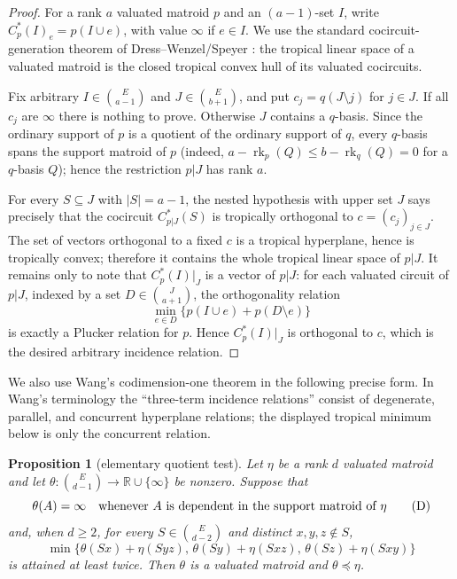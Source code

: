 \documentclass[12pt]{article}
\newcommand{\rk}{\operatorname{rk}}
\newtheorem{proposition}{Proposition}
\begin{document}
\begin{proof}
For a rank $a$ valuated matroid $p$ and an $(a-1)$-set $I$, write
$C^*_p(I)_e=p(I\cup e)$, with value $\infty$ if $e\in I$.  We use the
standard cocircuit-generation theorem of Dress--Wenzel/Speyer \cite{DW,Speyer}: the
tropical linear space of a valuated matroid is the closed tropical convex
hull of its valuated cocircuits.

Fix arbitrary $I\in\binom{E}{a-1}$ and $J\in\binom{E}{b+1}$, and put
$c_j=q(J\setminus j)$ for $j\in J$.  If all $c_j$ are $\infty$ there is
nothing to prove.  Otherwise $J$ contains a $q$-basis.  Since the
ordinary support of $p$ is a quotient of the ordinary support of $q$,
every $q$-basis spans the support matroid of $p$ (indeed,
$a-\rk_p(Q)\le b-\rk_q(Q)=0$ for a $q$-basis $Q$); hence the
restriction $p|J$ has rank $a$.

For every $S\subseteq J$ with $|S|=a-1$, the nested hypothesis with
upper set $J$ says precisely that the cocircuit $C^*_{p|J}(S)$ is
tropically orthogonal to $c=(c_j)_{j\in J}$.  The set of vectors
orthogonal to a fixed $c$ is a tropical hyperplane, hence is tropically
convex; therefore it contains the whole tropical linear space of $p|J$.
It remains only to note that $C^*_p(I)|_J$ is a vector of $p|J$: for
each valuated circuit of $p|J$, indexed by a set
$D\in\binom{J}{a+1}$, the orthogonality relation
\[
 \min_{e\in D}\{p(I\cup e)+p(D\setminus e)\}
\]
is exactly a Plucker relation for $p$.  Hence $C^*_p(I)|_J$ is
orthogonal to $c$, which is the desired arbitrary incidence relation.
\end{proof}

We also use Wang's codimension-one theorem in the following precise
form.  In Wang's terminology the ``three-term incidence relations''
consist of degenerate, parallel, and concurrent hyperplane relations;
the displayed tropical minimum below is only the concurrent relation.

\begin{proposition}[elementary quotient test]\label{prop:elementarytest}
Let $\eta$ be a rank $d$ valuated matroid and let
$\theta:\binom{E}{d-1}\to{\mathbb R}\cup\{\infty\}$ be nonzero.  Suppose
that
\[
        \theta(A)=\infty\quad\hbox{whenever }A
        \hbox{ is dependent in the support matroid of }\eta              \tag{D}
\]
and, when $d\ge2$, for every $S\in\binom{E}{d-2}$ and distinct $x,y,z\notin S$,
\[
\min\{\theta(Sx)+\eta(Syz),\,
      \theta(Sy)+\eta(Sxz),\,
      \theta(Sz)+\eta(Sxy)\}                                      \tag{C}
\]
is attained at least twice.  Then $\theta$ is a valuated matroid and
$\theta\preceq\eta$.
\end{proposition}
\end{document}

